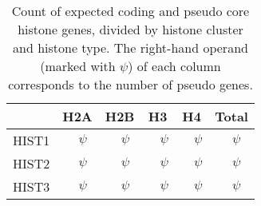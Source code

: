 
    \begin{table*}
      \caption{Count of expected coding and pseudo core histone genes,
               divided by histone cluster and histone type. The right-hand
               operand (marked with $\psi$) of each column corresponds to the
               number of pseudo genes.}
      \label{tab:histone-gene-count}
      \centering
      \begin{tabular}{l r@{ + }l<{$\psi$} r@{ + }l<{$\psi$} r@{ + }l<{$\psi$} r@{ + }l<{$\psi$} r@{ + }l<{$\psi$}}
        \toprule
        \null   & \multicolumn{2}{c}{H2A}  & \multicolumn{2}{c}{H2B}
                & \multicolumn{2}{c}{H3}   & \multicolumn{2}{c}{H4}
                & \multicolumn{2}{c}{Total} \\
        \midrule
        HIST1   & \HTwoACodingInHISTOne{}   & \HTwoAPseudoInHISTOne{}
                & \HTwoBCodingInHISTOne{}     & \HTwoBPseudoInHISTOne{}
                & \HThreeCodingInHISTOne{}    & \HThreePseudoInHISTOne{}
                & \HFourCodingInHISTOne{}     & \HFourPseudoInHISTOne{}
                & \CodingGenesInHISTOne{}   & \PseudoGenesInHISTOne{} \\
        HIST2   & \HTwoACodingInHISTTwo{}     & \HTwoAPseudoInHISTTwo{}
                & \HTwoBCodingInHISTTwo{}     & \HTwoBPseudoInHISTTwo{}
                & \HThreeCodingInHISTTwo{}    & \HThreePseudoInHISTTwo{}
                & \HFourCodingInHISTTwo{}     & \HFourPseudoInHISTTwo{}
                & \CodingGenesInHISTTwo{}   & \PseudoGenesInHISTTwo{} \\
        HIST3   & \HTwoACodingInHISTThree{}   & \HTwoAPseudoInHISTThree{}
                & \HTwoBCodingInHISTThree{}   & \HTwoBPseudoInHISTThree{}
                & \HThreeCodingInHISTThree{}  & \HThreePseudoInHISTThree{}

\end{tabular}
\end{table*}

